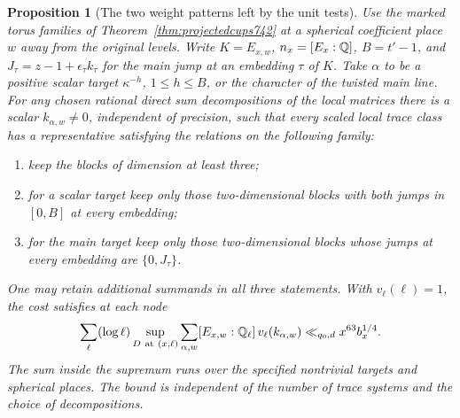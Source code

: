\documentclass[a4paper,11pt]{article}
\newtheorem{proposition}{Proposition}[section]
\theoremstyle{definition}
\theoremstyle{remark}
\numberwithin{equation}{section}
\begin{document}
\begin{proposition}[The two weight patterns left by the unit tests]
\leavevmode\label{prop:twoweights754}
Use the marked torus families of Theorem~\ref{thm:projectedcups742}
at a spherical coefficient place \(w\) away from the original
levels. Write \(K=E_{x,w}\), \(n_x=[E_x:\mathbb Q]\), \(B=t'-1\),
and \(J_\tau=z-1+\epsilon_\tau k_\tau\) for the main jump at
an embedding \(\tau\) of \(K\).
Take \(\alpha\) to be a positive scalar target \(\kappa^{-h}\),
\(1\le h\le B\), or the character of the twisted main line.
For any chosen rational direct sum decompositions of the
local matrices there is a scalar \(k_{\alpha,w}\ne0\), independent
of precision, such that every scaled local trace class has a
representative satisfying the relations on the following family:
\begin{enumerate}
\item keep the blocks of dimension at least three;
\item for a scalar target keep only those two-dimensional
blocks with both jumps in \([0,B]\) at every embedding;
\item for the main target keep only those two-dimensional
blocks whose jumps at every embedding are \(\{0,J_\tau\}\).
\end{enumerate}
One may retain additional summands in all three statements.
With \(v_\ell(\ell)=1\), the cost satisfies at each node
\[
 \sum_\ell(\log\ell)
    \sup_{D\ {\rm at}\ (x,\ell)}
     \sum_{\alpha,w}[E_{x,w}:\mathbb Q_\ell]\,v_\ell(k_{\alpha,w})
                 \ll_{q_0,d} x^{63}b_x^{1/4}.
\]
The sum inside the supremum runs over the specified nontrivial
targets and spherical places. The bound is independent of the
number of trace systems and the choice of decompositions.
\end{proposition}
\end{document}
